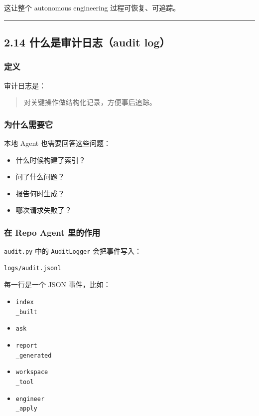 \documentclass[UTF8,12pt,openany]{ctexbook}
\begin{document}
这让整个 autonomous engineering 过程可恢复、可追踪。\par

\hrule

\subsection{2.14 什么是审计日志（audit log）}

\subsubsection{定义}

审计日志是：\par

\begin{quote}
对关键操作做结构化记录，方便事后追踪。
\end{quote}

\subsubsection{为什么需要它}

本地 Agent 也需要回答这些问题：\par

\begin{itemize}
\item 什么时候构建了索引？
\item 问了什么问题？
\item 报告何时生成？
\item 哪次请求失败了？
\end{itemize}

\subsubsection{在 Repo Agent 里的作用}

\texttt{audit.py} 中的 \texttt{AuditLogger} 会把事件写入：\par

\begin{lstlisting}
logs/audit.jsonl
\end{lstlisting}

每一行是一个 JSON 事件，比如：\par

\begin{itemize}
\item \texttt{index\\_built}
\item \texttt{ask}
\item \texttt{report\\_generated}
\item \texttt{workspace\\_tool}
\item \texttt{engineer\\_apply}
\end{itemize}
\end{document}
